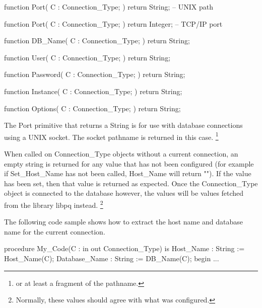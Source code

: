\documentclass[english,letterpaper]{book}
\begin{document}
\begin{Code}
function Port(
   C : Connection_Type;
) return String;  -- UNIX path
\end{Code}

\begin{Code}
function Port(
   C : Connection_Type;
) return Integer; -- TCP/IP port
\end{Code}

\begin{Code}
function DB_Name(
   C : Connection_Type;
) return String;
\end{Code}

\begin{Code}
function User(
   C : Connection_Type;
) return String;
\end{Code}

\begin{Code}
function Password(
   C : Connection_Type;
) return String;
\end{Code}

\begin{Code}
function Instance(
   C : Connection_Type;
) return String;
\end{Code}

\begin{Code}
function Options(
   C : Connection_Type;
) return String;
\end{Code}

The Port primitive that returns a String is for use with database
connections using a UNIX socket. The socket
pathname is returned in this case.
\footnote{or at least a fragment of the pathname.}

When called on Connection\_Type objects without a current connection,
an empty string is returned for any value that has not been configured
(for example if Set\-\_Host\-\_Name has not been called, Host\-\_Name will
return ""). If the value has been set, then that value is returned
as expected. Once the Connection\-\_Type object is connected to the
database however, the values will be values fetched from the library
libpq instead.
\footnote{Normally, these values should agree with what was configured.}

The following code sample shows how to extract the host name and database
name for the current connection.

\begin{Example}
procedure My_Code(C : in out Connection_Type) is
   Host_Name :     String := Host_Name(C);
   Database_Name : String := DB_Name(C);
begin
   ...
\end{Example}
\end{document}
